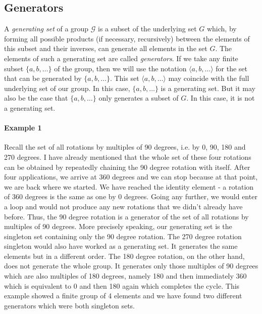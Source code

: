 \subsection{Generators}



A \emph{generating set} of a group $\mathcal{G}$ is a subset of the underlying set $G$ which, by forming all possible products (if necessary, recursively) between the elements of this subset and their inverses, can generate all elements in the set $G$. The elements of such a generating set are called \emph{generators}. If we take any finite subset $\{ a, b, \ldots \}$ of the group, then we will use the notation $\langle a, b, \ldots \rangle$ for the set that can be generated by $\{ a, b, \ldots \}$. This set $\langle a, b, \ldots \rangle$ may coincide with the full underlying set of our group. In this case, $\{ a, b, \ldots \}$ is a generating set. But it may also be the case that $\{ a, b, \ldots \}$ only generates a subset of $G$. In this case, it is not a generating set.


\paragraph{Example 1} Recall the set of all rotations by multiples of 90 degrees, i.e. by 0, 90, 180 and 270 degrees. I have already mentioned that the whole set of these four rotations can be obtained by repeatedly chaining the 90 degree rotation with itself. After four applications, we arrive at 360 degrees and we can stop because at that point, we are back where we started. We have reached the identity element - a rotation of 360 degrees is the same as one by 0 degrees. Going any further, we would enter a loop and would not produce any new rotations that we didn't already have before. Thus, the 90 degree rotation is a generator of the set of all rotations by multiples of 90 degrees. More precisely speaking, our generating set is the singleton set containing only the 90 degree rotation. The 270 degree rotation singleton would also have worked as a generating set. It generates the same elements but in a different order. The 180 degree rotation, on the other hand, does not generate the whole group. It generates only those multiples of 90 degrees which are also multiples of 180 degrees, namely 180 and then immediately 360 which is equivalent to 0 and then 180 again which completes the cycle. This example showed a finite group of 4 elements and we have found two different generators which were both singleton sets.

